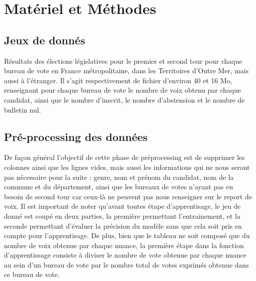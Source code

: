 \documentclass[11pt]{article}
\begin{document}
    \newpage
    \section{Matériel et Méthodes}

        \subsection*{Jeux de donnés}
            Résultats des élections législatives pour le premier et second tour pour chaque bureau de vote en France métropolitaine, dans les Territoires d'Outre Mer, mais aussi à  l'étranger. Il s'agit respectivement de fichier d'environ 40 et 16 Mo, renseignant pour chaque bureau de vote le nombre de voix obtenu par chaque candidat, ainsi que le nombre d'inscrit, le nombre d'abstension et le nombre de bulletin nul.
        
        \subsection*{Pré-processing des données}
            De façon général l'objectif de cette phase de préprocessing est de supprimer les colonnes ainsi que les lignes vides, mais aussi les informations qui ne nous seront pas nécessaire pour la suite : genre, nom et prénom du candidat, nom de la commune et du département, ainsi que les bureaux de votes n'ayant pas eu besoin de second tour car ceux-là ne peuvent pas nous renseigner sur le report de voix. Il est important de noter qu'avant toutes étape d'apprentisage, le jeu de donné est coupé en deux parties, la première permettant l'entrainement, et la seconde permettant d'évaluer la précision du modèle sans que cela soit pris en compte pour l'apprentisage. De plus, bien que le tableau ne soit composé que du nombre de voix obtenue par chaque nuance, la première étape dans la fonction d'apprentissage consiste à diviser le nombre de vote obtenue par chaque nuance au sein d'un bureau de vote par le nombre total de votes exprimés obtenue dans ce bureau de vote.
\end{document}
